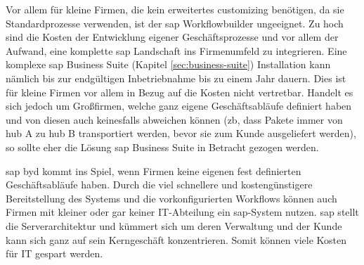 
Vor allem für kleine Firmen, die kein erweitertes \gls{customizing} benötigen, da sie Standardprozesse verwenden, ist der \gls{sap} Workflowbuilder ungeeignet. Zu hoch sind die Kosten der Entwicklung eigener Geschäftsprozesse und vor allem der Aufwand, eine komplette \gls{sap} Landschaft ins Firmenumfeld zu integrieren. Eine komplexe \gls{sap} Business Suite (Kapitel \ref{sec:business-suite}) Installation kann nämlich bis zur endgültigen Inbetriebnahme bis zu einem Jahr dauern. Dies ist für kleine Firmen vor allem in Bezug auf die Kosten nicht vertretbar. Handelt es sich jedoch um Großfirmen, welche ganz eigene Geschäftsabläufe definiert haben und von diesen auch keinesfalls abweichen können (\gls{zb}, dass Pakete immer von \gls{hub} A zu \gls{hub} B transportiert werden, bevor sie zum Kunde ausgeliefert werden), so sollte eher die Lösung \gls{sap} Business Suite in Betracht gezogen werden.

\gls{sap} \gls{byd} kommt ins Spiel, wenn Firmen keine eigenen fest definierten Geschäftsabläufe haben. Durch die viel schnellere und kostengünstigere Bereitstellung des Systems und die vorkonfigurierten Workflows können auch Firmen mit kleiner oder gar keiner IT-Abteilung ein \gls{sap}-System nutzen. \gls{sap} stellt die Serverarchitektur und kümmert sich um deren Verwaltung und der Kunde kann sich ganz auf sein Kerngeschäft konzentrieren. Somit können viele Kosten für IT gespart werden.

